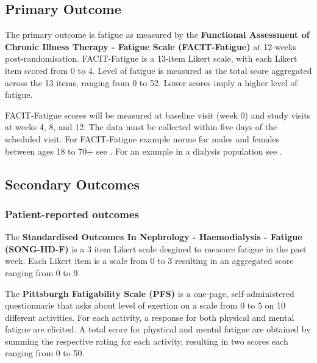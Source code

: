 \documentclass[
]{article}
\begin{document}
\hypertarget{primary-outcome}{
  \subsection{Primary Outcome}\label{primary-outcome}}

The primary outcome is fatigue as measured by the \textbf{Functional Assessment of Chronic Illness Therapy - Fatigue Scale (FACIT-Fatigue)} \cites{yellen1997measuring}{cella2002fatigue} at 12-weeks post-randomisation.
FACIT-Fatigue is a 13-item Likert scale, with each Likert item scored from 0 to 4.
Level of fatigue is measured as the total score aggregated across the 13 items, ranging from 0 to 52.
Lower scores imply a higher level of fatigue.

FACIT-Fatigue scores will be measured at baseline visit (week 0) and study visits at weeks 4, 8, and 12.
The data must be collected within five days of the scheduled visit.
For FACIT-Fatigue example norms for males and females between ages 18 to 70+ see \cite{montan2018general}.
For an example in a dialysis population see \cite{wang2015psychometric}.

\hypertarget{secondary-outcomes}{
  \subsection{Secondary Outcomes}\label{secondary-outcomes}}

\hypertarget{pro-outcomes}{
  \subsubsection{Patient-reported outcomes}\label{pro-outcomes}}

\label{outcome:song-hd-f}
The \textbf{Standardised Outcomes In Nephrology - Haemodialysis - Fatigue (SONG-HD-F)} \cite{ju2018establishing} is a 3 item Likert scale desgined to measure fatigue in the past week.
Each Likert item is a scale from 0 to 3 resulting in an aggregated score ranging from 0 to 9.

\label{outcome:pfs}
The \textbf{Pittsburgh Fatigability Scale (PFS)} \cite{glynn2015pittsburgh} is a one-page, self-administered questionnarie that asks about level of exertion on a scale from 0 to 5 on 10 different activities.
For each activity, a response for both physical and mental fatigue are elicited.
A total score for phystical and mental fatigue are obtained by summing the respective rating for each activity, resulting in two scores each ranging from 0 to 50.
\end{document}
